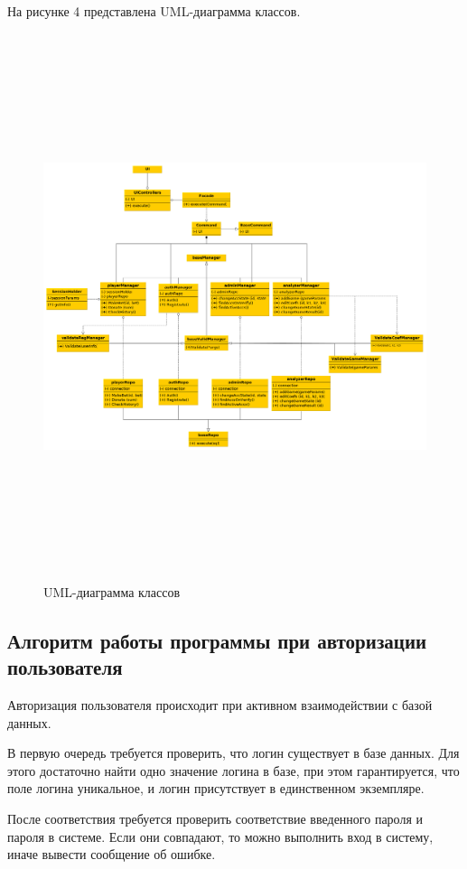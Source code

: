 На рисунке 4 представлена UML-диаграмма классов.
\FloatBarrier
\begin{figure}[h]	
	\begin{center}
		\includegraphics[angle=90, width=\linewidth, height=16cm]{inc/uml.png}
	\end{center}
	\caption{UML-диаграмма классов}
	\label{fig::uml}
\end{figure}
\FloatBarrier

\subsection{Алгоритм работы программы при авторизации пользователя}
Авторизация пользователя происходит при активном взаимодействии с базой данных.

В первую очередь требуется проверить, что логин существует в базе данных. 
Для этого достаточно найти одно значение логина в базе, при этом гарантируется, что поле логина уникальное, и логин присутствует в единственном экземпляре.

После соответствия требуется проверить соответствие введенного пароля и пароля в системе. 
Если они совпадают, то можно выполнить вход в систему, иначе вывести сообщение об ошибке.

